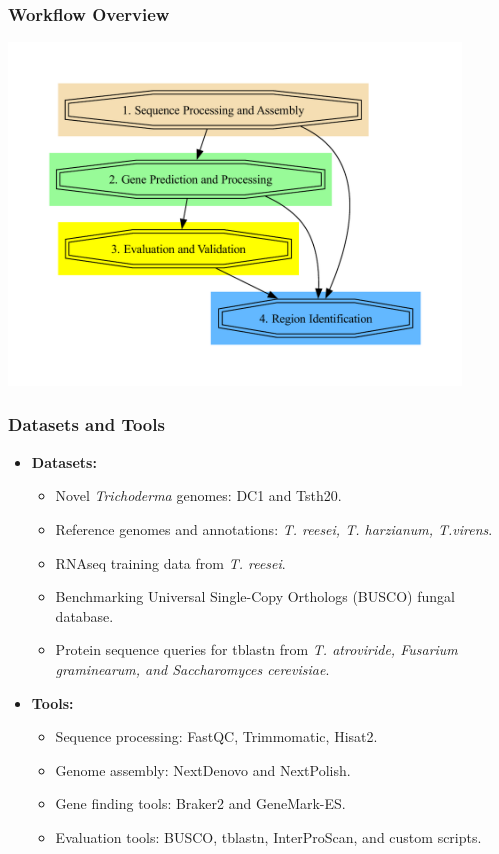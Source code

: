 \documentclass[t]{beamer}
\begin{document}
\begin{frame}
	\frametitle{Workflow Overview}
	\centering
	\includegraphics[width=0.9\textwidth]{../../working-thesis/figures/workflow-simple.pdf}
\end{frame}

\begin{frame}
	\frametitle{Datasets and Tools}
	\begin{itemize}
		\item \textbf{Datasets:}
		\begin{itemize}
			\item Novel \textit{Trichoderma} genomes: DC1 and Tsth20.
			\item Reference genomes and annotations: \textit{T. reesei, T. harzianum, T.virens}.
			\item RNAseq training data from \textit{T. reesei}. 
			\item Benchmarking Universal Single-Copy Orthologs (BUSCO) fungal database.
			\item Protein sequence queries for tblastn from \textit{T. atroviride, Fusarium graminearum, and Saccharomyces cerevisiae}.	
		\end{itemize}
		\item \textbf{Tools:}
		\begin{itemize}
			\item Sequence processing: FastQC, Trimmomatic, Hisat2.
			\item Genome assembly: NextDenovo and NextPolish.
			\item Gene finding tools: Braker2 and GeneMark-ES.
			\item Evaluation tools: BUSCO, tblastn, InterProScan, and custom scripts.
		\end{itemize}
	\end{itemize}
\end{frame}
\end{document}
